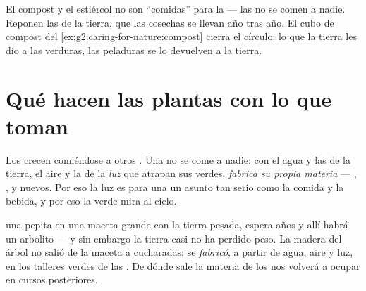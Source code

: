 \begin{remark}\label{rem:g4:what-plants-need:soil}
El compost y el estiércol no son ``comidas'' para la  --- las
 no se comen a nadie. Reponen las  de la tierra,
que las cosechas se llevan año tras año. El cubo de compost del
\cref{ex:g2:caring-for-nature:compost} cierra el círculo: lo que la
tierra les dio a las verduras, las peladuras se lo devuelven a la
tierra.
\end{remark}

\section{Qué hacen las plantas con lo que toman}

\begin{proposition}\label{prop:g4:what-plants-need:make}
Los  crecen comiéndose a otros . Una  no se
come a nadie: con el agua y las  de la tierra, el aire
y la  de la \emph{luz} que atrapan sus  verdes,
\emph{fabrica su propia materia} --- , ,  y 
nuevos. Por eso la luz es para una  un asunto tan serio como la
comida y la bebida, y por eso la  verde mira al cielo.
\end{proposition}
\admitted

\begin{example}\label{ex:g4:what-plants-need:tree}
 una pepita en una maceta grande con la tierra pesada, espera
años y allí habrá un arbolito --- y sin embargo la tierra casi no ha
perdido peso. La madera del árbol no salió de la maceta a cucharadas:
se \emph{fabricó}, a partir de agua, aire y luz, en los talleres
verdes de las . De dónde sale la materia de los  nos
volverá a ocupar en cursos posteriores.
\end{example}

